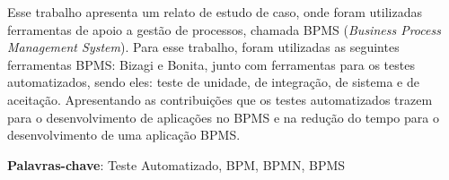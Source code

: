 Esse trabalho apresenta um relato de estudo de caso, onde foram utilizadas ferramentas de apoio a gestão de processos, chamada BPMS (\textit{Business Process Management System}). Para esse trabalho, foram utilizadas as seguintes ferramentas BPMS: Bizagi e Bonita, junto com ferramentas para os testes automatizados, sendo eles: teste de unidade, de integração, de sistema e de aceitação. Apresentando as contribuições que os testes automatizados trazem para o desenvolvimento de aplicações no BPMS e na redução do tempo para o desenvolvimento de uma aplicação BPMS.

\textbf{Palavras-chave}: Teste Automatizado, BPM, BPMN, BPMS 